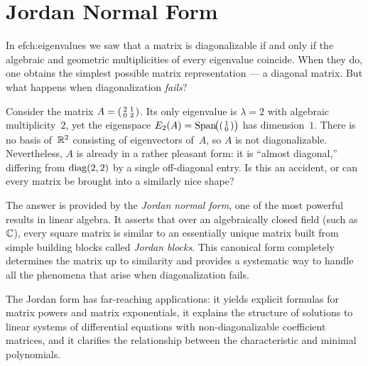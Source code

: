 
\chapter{Jordan Normal Form}\label{ch:jordan}


In 
ef{ch:eigenvalues} we saw that a matrix is diagonalizable if and
only if the algebraic and geometric multiplicities of every eigenvalue
coincide.  When they do, one obtains the simplest possible matrix
representation --- a diagonal matrix.  But what happens when
diagonalization \emph{fails}?

Consider the matrix
$A = \begin{psmallmatrix} 2 & 1 \\ 0 & 2 \end{psmallmatrix}$.
Its only eigenvalue is $\lambda = 2$ with algebraic multiplicity~$2$,
yet the eigenspace $E_2(A) = \operatorname{Span}\!\bigl(\begin{psmallmatrix} 1 \\ 0
\end{psmallmatrix}\bigr)$ has dimension~$1$.  There is no basis
of~${\mathbb{R}}^2$ consisting of eigenvectors of~$A$, so $A$ is not
diagonalizable.  Nevertheless, $A$ is already in a rather pleasant
form: it is ``almost diagonal,'' differing from $\operatorname{diag}(2,2)$ by a
single off-diagonal entry.  Is this an accident, or can every matrix be
brought into a similarly nice shape?

The answer is provided by the \emph{Jordan normal form}, one of the most powerful results in linear algebra.  It
asserts that over an algebraically closed field (such as~${\mathbb{C}}$), every
square matrix is similar to an essentially unique matrix built from
simple building blocks called \emph{Jordan blocks}.  This canonical form
completely determines the matrix up to similarity and provides a
systematic way to handle all the phenomena that arise when
diagonalization fails.

The Jordan form has far-reaching applications: it yields explicit
formulas for matrix powers and matrix exponentials, it explains the
structure of solutions to linear systems of differential equations with
non-diagonalizable coefficient matrices, and it clarifies the
relationship between the characteristic and minimal polynomials.

